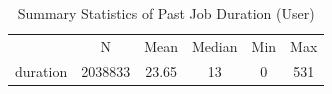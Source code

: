 \begin{table}[htbp]\centering
\def\sym#1{\ifmmode^{#1}\else\(^{#1}\)\fi}
\caption{Summary Statistics of Past Job Duration  (User)}
\begin{tabular}{l*{1}{ccccc}}
\toprule
                    &           N&        Mean&      Median&         Min&         Max\\
\label{tab:userjobduration}
duration            &     2038833&       23.65&          13&           0&         531\\
\bottomrule
\end{tabular}
\end{table}
